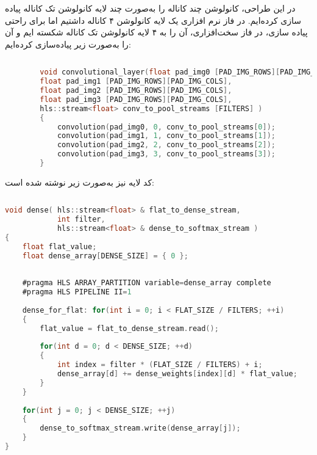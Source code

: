 در این طراحی، کانولوشن چند کاناله را به‌صورت چند لایه کانولوشن تک کاناله پیاده سازی کرده‌ایم. در فاز نرم افزاری یک لایه کانولوشن ۴ کاناله داشتیم اما برای راحتی پیاده سازی، در فاز سخت‌افزاری، آن را به ۴ لایه کانولوشن تک کاناله شکسته ایم و آن را به‌صورت زیر پیاده‌سازی کرده‌ایم:



\begin{latin}
	\begin{lstlisting}[language=C,caption={HLS Implementation of Convolution Layers}]
		
		void convolutional_layer(float pad_img0 [PAD_IMG_ROWS][PAD_IMG_COLS],
		float pad_img1 [PAD_IMG_ROWS][PAD_IMG_COLS],
		float pad_img2 [PAD_IMG_ROWS][PAD_IMG_COLS],
		float pad_img3 [PAD_IMG_ROWS][PAD_IMG_COLS],
		hls::stream<float> conv_to_pool_streams [FILTERS] )
		{
			convolution(pad_img0, 0, conv_to_pool_streams[0]);
			convolution(pad_img1, 1, conv_to_pool_streams[1]);
			convolution(pad_img2, 2, conv_to_pool_streams[2]);
			convolution(pad_img3, 3, conv_to_pool_streams[3]);
		}
	\end{lstlisting}
\end{latin}




کد لایه  نیز به‌صورت زیر نوشته شده است:

\begin{latin}
\begin{lstlisting}[language=C,caption={HLS Implementation of Dense Layer}]
	
void dense( hls::stream<float> & flat_to_dense_stream,
			int filter,
			hls::stream<float> & dense_to_softmax_stream )
{
	float flat_value;
	float dense_array[DENSE_SIZE] = { 0 };
	
	
	#pragma HLS ARRAY_PARTITION variable=dense_array complete
	#pragma HLS PIPELINE II=1
	
	dense_for_flat: for(int i = 0; i < FLAT_SIZE / FILTERS; ++i)
	{
		flat_value = flat_to_dense_stream.read();
		
		for(int d = 0; d < DENSE_SIZE; ++d)
		{
			int index = filter * (FLAT_SIZE / FILTERS) + i;
			dense_array[d] += dense_weights[index][d] * flat_value;
		}
	}
	
	for(int j = 0; j < DENSE_SIZE; ++j)
	{
		dense_to_softmax_stream.write(dense_array[j]);
	}
}
\end{lstlisting}
\end{latin}




